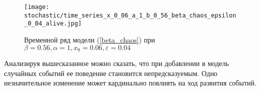         \begin{figure}
            \centering
            \texttt{[image: stochastic/time\_series\_x\_0\_06\_a\_1\_b\_0\_56\_beta\_chaos\_epsilon\_0\_04\_alive.jpg]}
        
            \captionsetup{justification=centering}
            \caption{Временной ряд модели (\ref{beta_chaos}) при \(\beta = 0.56, \alpha = 1, x_0 = 0.06, \varepsilon = 0.04\)}
            \label{time_series_x_0_06_a_1_b_0_56_beta_chaos_epsilon_0_04_alive}
        \end{figure}

        Анализируя вышесказанное можно сказать, что при добавлении в модель случайных событий ее поведение становится непредсказуемым. Одно незначительное изменение может кардинально повлиять на ход развития событий. 

